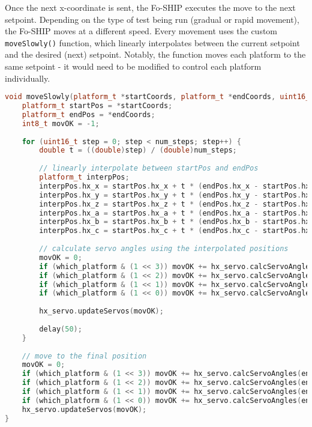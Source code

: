 \documentclass[12pt,a4paper]{report}
\begin{document}
Once the next x-coordinate is sent, the Fo-SHIP executes the move to the next setpoint. Depending on the type of test being run (gradual or rapid movement), the Fo-SHIP moves at a different speed. Every movement uses the custom \verb|moveSlowly()| function, which linearly interpolates between the current setpoint and the desired (next) setpoint. Notably, the function moves each platform to the same setpoint - it would need to be modified to control each platform individually.

\begin{lstlisting}[language=C++]
void moveSlowly(platform_t *startCoords, platform_t *endCoords, uint16_t num_steps, uint8_t which_platform) {
	platform_t startPos = *startCoords;
	platform_t endPos = *endCoords;
	int8_t movOK = -1;
	
	for (uint16_t step = 0; step < num_steps; step++) {
		double t = ((double)step) / (double)num_steps;
		
		// linearly interpolate between startPos and endPos
		platform_t interpPos;
		interpPos.hx_x = startPos.hx_x + t * (endPos.hx_x - startPos.hx_x);
		interpPos.hx_y = startPos.hx_y + t * (endPos.hx_y - startPos.hx_y);
		interpPos.hx_z = startPos.hx_z + t * (endPos.hx_z - startPos.hx_z);
		interpPos.hx_a = startPos.hx_a + t * (endPos.hx_a - startPos.hx_a);
		interpPos.hx_b = startPos.hx_b + t * (endPos.hx_b - startPos.hx_b);
		interpPos.hx_c = startPos.hx_c + t * (endPos.hx_c - startPos.hx_c);
		
		// calculate servo angles using the interpolated positions
		movOK = 0;
		if (which_platform & (1 << 3)) movOK += hx_servo.calcServoAngles(interpPos, servo_angles0, 0);
		if (which_platform & (1 << 2)) movOK += hx_servo.calcServoAngles(interpPos, servo_angles1, 1);
		if (which_platform & (1 << 1)) movOK += hx_servo.calcServoAngles(interpPos, servo_angles2, 2);
		if (which_platform & (1 << 0)) movOK += hx_servo.calcServoAngles(interpPos, servo_angles3, 3);
		
		hx_servo.updateServos(movOK);
		
		delay(50);
	}
	
	// move to the final position
	movOK = 0;
	if (which_platform & (1 << 3)) movOK += hx_servo.calcServoAngles(endPos, servo_angles0, 0);
	if (which_platform & (1 << 2)) movOK += hx_servo.calcServoAngles(endPos, servo_angles1, 1);
	if (which_platform & (1 << 1)) movOK += hx_servo.calcServoAngles(endPos, servo_angles2, 2);
	if (which_platform & (1 << 0)) movOK += hx_servo.calcServoAngles(endPos, servo_angles3, 3);
	hx_servo.updateServos(movOK);
}
\end{lstlisting}
\end{document}

